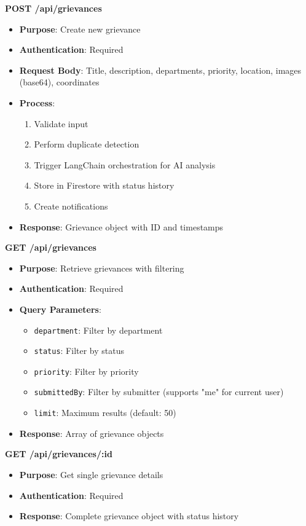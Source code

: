\documentclass[12pt,a4paper]{article}
\begin{document}
\textbf{POST /api/grievances}
\begin{itemize}
    \item \textbf{Purpose}: Create new grievance
    \item \textbf{Authentication}: Required
    \item \textbf{Request Body}: Title, description, departments, priority, location, images (base64), coordinates
    \item \textbf{Process}:
    \begin{enumerate}
        \item Validate input
        \item Perform duplicate detection
        \item Trigger LangChain orchestration for AI analysis
        \item Store in Firestore with status history
        \item Create notifications
    \end{enumerate}
    \item \textbf{Response}: Grievance object with ID and timestamps
\end{itemize}

\textbf{GET /api/grievances}
\begin{itemize}
    \item \textbf{Purpose}: Retrieve grievances with filtering
    \item \textbf{Authentication}: Required
    \item \textbf{Query Parameters}:
    \begin{itemize}
        \item \texttt{department}: Filter by department
        \item \texttt{status}: Filter by status
        \item \texttt{priority}: Filter by priority
        \item \texttt{submittedBy}: Filter by submitter (supports "me" for current user)
        \item \texttt{limit}: Maximum results (default: 50)
    \end{itemize}
    \item \textbf{Response}: Array of grievance objects
\end{itemize}

\textbf{GET /api/grievances/:id}
\begin{itemize}
    \item \textbf{Purpose}: Get single grievance details
    \item \textbf{Authentication}: Required
    \item \textbf{Response}: Complete grievance object with status history
\end{itemize}
\end{document}
